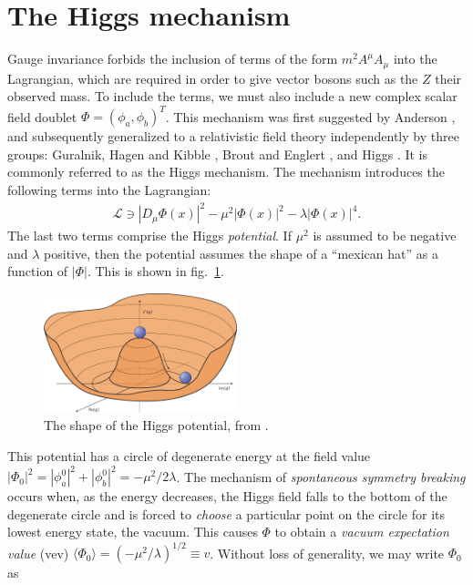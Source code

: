 \documentclass[twoside,english]{uiofysmaster}
\begin{document}
\section{The Higgs mechanism}
Gauge invariance forbids the inclusion of terms of the form $m^2A^\mu A_\mu$ into the Lagrangian, which are required in order to give vector bosons such as the $Z$ their observed mass. To include the terms, we must also include a new complex scalar field doublet $\Phi = (\phi_a, \phi_b)^T$. This mechanism was first suggested by Anderson \cite{1963PhRv..130..439A}, and subsequently generalized to a relativistic field theory independently by three groups: Guralnik, Hagen and Kibble \cite{1964PhRvL..13..585G}, Brout and Englert \cite{1964PhRvL..13..321E}, and Higgs \cite{Higgs:1964pj}. It is commonly referred to as the Higgs mechanism. The mechanism introduces the following terms into the Lagrangian:
\begin{align}
	\mathcal L \ni |D_\mu \Phi(x)|^2 - \mu^2|\Phi(x)|^2 - \lambda |\Phi(x)|^4.\label{eq:higgs_lagrange}
\end{align}
The last two terms comprise the Higgs {\it potential}. If $\mu^2$ is assumed to be negative and $\lambda$ positive, then the potential assumes the shape of a ``mexican hat'' as a function of $|\Phi|$. This is shown in fig.\ \ref{fig:higgspot}.
\begin{figure}[hbt]
	\centering
	\includegraphics[width=0.5\textwidth]{figures/susyintro/higgspot_nature.jpg}
	\caption{The shape of the Higgs potential, from \cite{Ellis:higgs}.}
	\label{fig:higgspot}
\end{figure}
This potential has a circle of degenerate energy at the field value $|\Phi_0|^2 = |\phi_a^0|^2 + |\phi_b^0|^2 = -\mu^2/2\lambda$. The mechanism of {\it spontaneous symmetry breaking} occurs when, as the energy decreases, the Higgs field falls to the bottom of the degenerate circle and is forced to {\it choose} a particular point on the circle for its lowest energy state, the vacuum. This causes $\Phi$ to obtain a {\it vacuum expectation value} (vev) $\langle \Phi_0 \rangle = (-\mu^2/\lambda)^{1/2} \equiv v$. Without loss of generality, we may write $\Phi_0$ as
\end{document}
